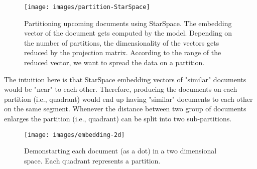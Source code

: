 \begin{figure}[!htb]
    \centering
    \texttt{[image: images/partition-StarSpace]}
    \caption{Partitioning upcoming documents using StarSpace. The embedding vector of the document gets computed by the model. Depending on the number of partitions, the dimensionality of the vectors gets reduced by the projection matrix. According to the range of the reduced vector, we want to spread the data on a partition.}
    \label{fig:star-space-partitioning-process}
\end{figure}


The intuition here is that StarSpace embedding vectors of "similar" documents would be "near" to each other. Therefore, producing the documents on each partition (i.e., quadrant) would end up having "similar" documents to each other on the same segment. Whenever the distance between two group of documents enlarges the partition (i.e., quadrant) can be split into two sub-partitions.


\begin{figure}[!htb]
    \centering
    \texttt{[image: images/embedding-2d]}
    \caption{Demonstarting each document (as a dot) in a two dimensional space. Each quadrant represents a partition.}
    \label{fig:embedding-space}
\end{figure}

